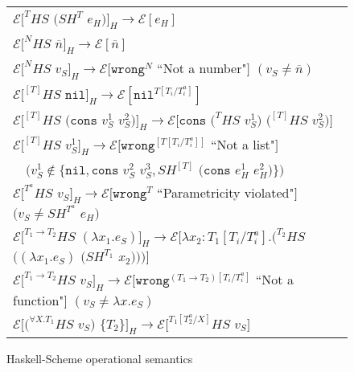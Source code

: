 \begin{figure}[p]
\centering
\begin{tabular}{l}
$\mathscr{E}[^{T}HS$ $(SH^{T}$ $e_{H})]_{H}\rightarrow\mathscr{E}[e_{H}]$ \\
$\mathscr{E}[^{N}HS$ $\overline{n}]_{H}\rightarrow\mathscr{E}[\overline{n}]$ \\
$\mathscr{E}[^{N}HS$ $v_{S}]_{H}\rightarrow\mathscr{E}[\mathtt{wrong}^{N}$ ``Not a number"$]$ $(v_{S}\neq\overline{n})$ \\
$\mathscr{E}[^{[T]}HS$ $\mathtt{nil}]_{H}\rightarrow\mathscr{E}[\mathtt{nil}^{T[T_{i}/T_{i}^{a}]}]$ \\
$\mathscr{E}[^{[T]}HS$ $(\mathtt{cons}$ $v_{S}^{1}$ $v_{S}^{2})]_{H}\rightarrow\mathscr{E}[\mathtt{cons}$ $(^{T}HS$ $v_{S}^{1})$ $(^{[T]}HS$ $v_{S}^{2})]$ \\
$\mathscr{E}[^{[T]}HS$ $v_{S}^{1}]_{H}\rightarrow\mathscr{E}[\mathtt{wrong}^{[T[T_{i}/T_{i}^{a}]]}$ ``Not a list"$]$ \\
$\quad(v_{S}^{1}\not\in\lbrace\mathtt{nil},\mathtt{cons}$ $v_{S}^{2}$ $v_{S}^{3},SH^{[T]}$ $(\mathtt{cons}$ $e_{H}^{1}$ $e_{H}^{2})\rbrace)$ \\
$\mathscr{E}[^{T^{a}}HS$ $v_{S}]_{H}\rightarrow\mathscr{E}[\mathtt{wrong}^{T}$ ``Parametricity violated"$]$ $(v_{S}\neq SH^{T^{a}}$ $e_{H})$ \\
$\mathscr{E}[^{T_{1}\rightarrow T_{2}}HS$ $(\lambda x_{1}.e_{S})]_{H}\rightarrow\mathscr{E}[\lambda x_{2}:T_{1}[T_{i}/T_{i}^{a}].(^{T_{2}}HS$ $((\lambda x_{1}.e_{S})$ $(SH^{T_{1}}$ $x_{2})))]$ \\
$\mathscr{E}[^{T_{1}\rightarrow T_{2}}HS$ $v_{S}]_{H}\rightarrow\mathscr{E}[\mathtt{wrong}^{(T_{1}\rightarrow T_{2})[T_{i}/T_{i}^{a}]}$ ``Not a function"$]$ $(v_{S}\neq\lambda x.e_{S})$ \\
$\mathscr{E}[(^{\forall X.T_{1}}HS$ $v_{S})$ $\lbrace T_{2}\rbrace]_{H}\rightarrow\mathscr{E}[^{T_{1}[T^{a}_{2}/X]}HS$ $v_{S}]$
\end{tabular}
\caption{Haskell-Scheme operational semantics}
\label{hsos}
\end{figure}